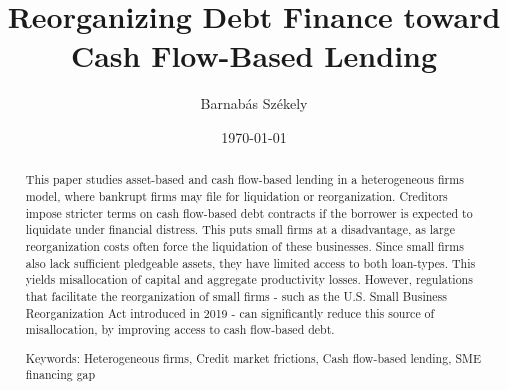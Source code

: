 \documentclass[12pt]{article}
\title{Reorganizing Debt Finance toward \\ Cash Flow-Based Lending}
\date{}
\begin{document}
\author{Barnabás Székely}
\date{\today}
\vspace{-1in}

\maketitle

\begin{abstract}
\noindent

This paper studies asset-based and cash flow-based lending in a heterogeneous firms model, where bankrupt firms may file for liquidation or reorganization. Creditors impose stricter terms on cash flow-based debt contracts if the borrower is expected to liquidate under financial distress. This puts small firms at a disadvantage, as large reorganization costs often force the liquidation of these businesses. Since small firms also lack sufficient pledgeable assets, they have limited access to both loan-types. This yields misallocation of capital and aggregate productivity losses. However, regulations that facilitate the reorganization of small firms - such as the  U.S. Small Business Reorganization Act introduced in 2019 - can significantly reduce this source of misallocation, by improving access to cash flow-based debt.

\bigskip{}
\bigskip{}

Keywords: Heterogeneous firms, Credit market frictions, Cash flow-based lending, SME financing gap
\medskip{}
\end{abstract}
\thispagestyle{empty}

\pagebreak{}
\end{document}

